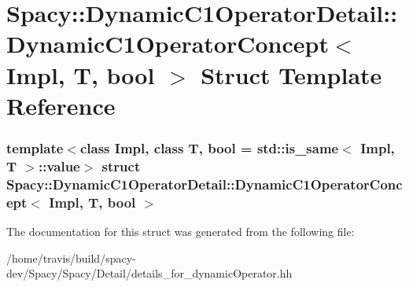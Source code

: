 \hypertarget{structSpacy_1_1DynamicC1OperatorDetail_1_1DynamicC1OperatorConcept}{\section{\-Spacy\-:\-:\-Dynamic\-C1\-Operator\-Detail\-:\-:\-Dynamic\-C1\-Operator\-Concept$<$ \-Impl, \-T, bool $>$ \-Struct \-Template \-Reference}
\label{structSpacy_1_1DynamicC1OperatorDetail_1_1DynamicC1OperatorConcept}
}
\subsubsection*{template$<$class Impl, class T, bool = std\-::is\-\_\-same$<$ Impl, T $>$\-::value$>$ struct Spacy\-::\-Dynamic\-C1\-Operator\-Detail\-::\-Dynamic\-C1\-Operator\-Concept$<$ Impl, T, bool $>$}



\-The documentation for this struct was generated from the following file\-:\begin{DoxyCompactItemize}
\item 
/home/travis/build/spacy-\/dev/\-Spacy/\-Spacy/\-Detail/details\-\_\-for\-\_\-dynamic\-Operator.\-hh\end{DoxyCompactItemize}
